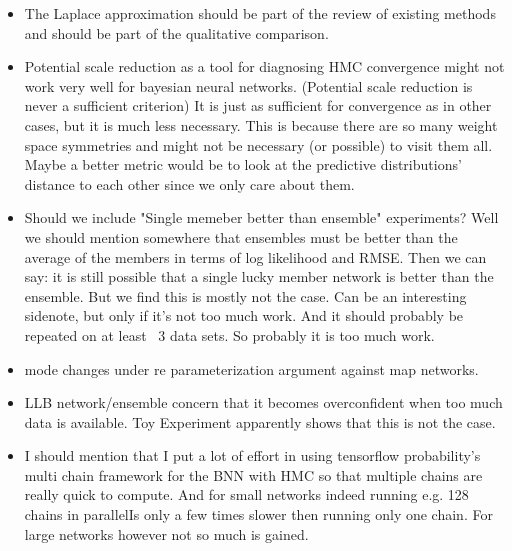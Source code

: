 \documentclass[12pt, A4, twoside]{report}
\begin{document}
\begin{itemize}
  \item The Laplace approximation should be part of the review of existing methods and should be part of the qualitative comparison. 
  \item Potential scale reduction as a tool for diagnosing HMC convergence might not work very well for bayesian neural networks. (Potential scale reduction is never a sufficient criterion) It is just as sufficient for convergence as in other cases, but it is much less necessary. This is because there are so many weight space symmetries and might not be necessary (or possible) to visit them all. Maybe a better metric would be to look at the predictive distributions' distance to each other since we only care about them.
  \item Should we include "Single memeber better than ensemble" experiments? Well we should mention somewhere that ensembles must be better than the average of the members in terms of log likelihood and RMSE. Then we can say: it is still possible that a single lucky member network is better than the ensemble. But we find this is mostly not the case. Can be an interesting sidenote, but only if it's not too much work. And it should probably be repeated on at least ~3 data sets. So probably it is too much work.
  \item mode changes under re parameterization argument against map networks.
  \item LLB network/ensemble concern that it becomes overconfident when too much data is available. Toy Experiment apparently shows that this is not the case.
  \item I should mention that I put a lot of effort in using tensorflow probability's multi chain framework for the BNN with HMC so that multiple chains are really quick to compute. And for small networks indeed running e.g. 128 chains in parallelIs only a few times slower then running only one chain.  For large networks however not so much is gained. \cite{lao2020tfp}
\end{itemize}
\printbibliography
\end{document}
